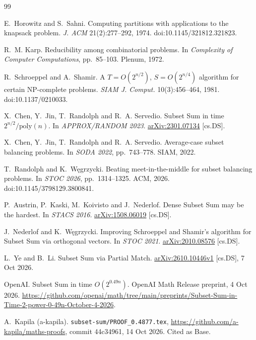 \documentclass[11pt]{article}
\theoremstyle{plain}
\begin{document}
\begin{thebibliography}{99}

E.~Horowitz and S.~Sahni. Computing partitions with applications to the knapsack problem. \emph{J. ACM} 21(2):277--292, 1974. doi:10.1145/321812.321823.

R.~M. Karp. Reducibility among combinatorial problems. In \emph{Complexity of Computer Computations}, pp.~85--103. Plenum, 1972.

R.~Schroeppel and A.~Shamir. A $T = O(2^{n/2})$, $S = O(2^{n/4})$ algorithm for certain NP-complete problems. \emph{SIAM J. Comput.} 10(3):456--464, 1981. doi:10.1137/0210033.

X.~Chen, Y.~Jin, T.~Randolph and R.~A. Servedio. Subset Sum in time $2^{n/2}/\mathrm{poly}(n)$. In \emph{APPROX/RANDOM 2023}. \href{https://arxiv.org/abs/2301.07134}{arXiv:2301.07134} [cs.DS].

X.~Chen, Y.~Jin, T.~Randolph and R.~A. Servedio. Average-case subset balancing problems. In \emph{SODA 2022}, pp.~743--778. SIAM, 2022.

T.~Randolph and K.~W\k{e}grzycki. Beating meet-in-the-middle for subset balancing problems. In \emph{STOC 2026}, pp.~1314--1325. ACM, 2026. doi:10.1145/3798129.3800841.

P.~Austrin, P.~Kaski, M.~Koivisto and J.~Nederlof. Dense Subset Sum may be the hardest. In \emph{STACS 2016}. \href{https://arxiv.org/abs/1508.06019}{arXiv:1508.06019} [cs.DS].

J.~Nederlof and K.~W\k{e}grzycki. Improving Schroeppel and Shamir's algorithm for Subset Sum via orthogonal vectors. In \emph{STOC 2021}. \href{https://arxiv.org/abs/2010.08576}{arXiv:2010.08576} [cs.DS].

L.~Ye and B.~Li. Subset Sum via Partial Match. \href{https://arxiv.org/abs/2610.10446v1}{arXiv:2610.10446v1} [cs.DS], 7 Oct 2026.

OpenAI. Subset Sum in time $O(2^{0.49n})$. OpenAI Math Release preprint, 4 Oct 2026. \url{https://github.com/openai/math/tree/main/preprints/Subset-Sum-in-Time-2-power-0-49n-October-4-2026}.

A.~Kapila (a-kapila). \texttt{subset-sum/PROOF\_0.4877.tex}, \url{https://github.com/a-kapila/maths-proofs}, commit 44c34961, 14 Oct 2026. Cited as Base.


\end{thebibliography}
\end{document}
